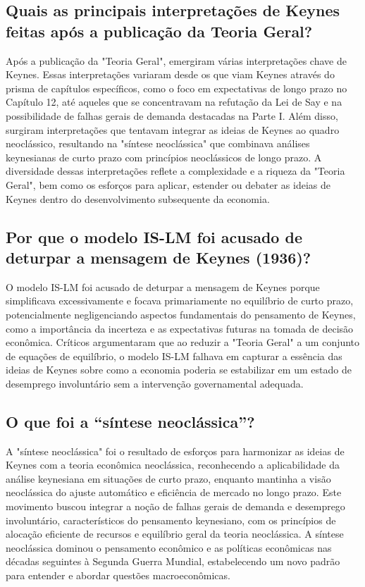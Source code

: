 \documentclass[12pt]{article}
\begin{document}
\subsection{\textbf{Quais as principais interpretações de Keynes feitas após a publicação da Teoria Geral?}}
Após a publicação da "Teoria Geral", emergiram várias interpretações chave de Keynes. Essas interpretações variaram desde os que viam Keynes através do prisma de capítulos específicos, como o foco em expectativas de longo prazo no Capítulo 12, até aqueles que se concentravam na refutação da Lei de Say e na possibilidade de falhas gerais de demanda destacadas na Parte I. Além disso, surgiram interpretações que tentavam integrar as ideias de Keynes ao quadro neoclássico, resultando na "síntese neoclássica" que combinava análises keynesianas de curto prazo com princípios neoclássicos de longo prazo. A diversidade dessas interpretações reflete a complexidade e a riqueza da "Teoria Geral", bem como os esforços para aplicar, estender ou debater as ideias de Keynes dentro do desenvolvimento subsequente da economia.
\subsection{\textbf{Por que o modelo IS-LM foi acusado de deturpar a mensagem de Keynes (1936)?}}
O modelo IS-LM foi acusado de deturpar a mensagem de Keynes porque simplificava excessivamente e focava primariamente no equilíbrio de curto prazo, potencialmente negligenciando aspectos fundamentais do pensamento de Keynes, como a importância da incerteza e as expectativas futuras na tomada de decisão econômica. Críticos argumentaram que ao reduzir a "Teoria Geral" a um conjunto de equações de equilíbrio, o modelo IS-LM falhava em capturar a essência das ideias de Keynes sobre como a economia poderia se estabilizar em um estado de desemprego involuntário sem a intervenção governamental adequada.
\subsection{\textbf{O que foi a “síntese neoclássica”?}}
A "síntese neoclássica" foi o resultado de esforços para harmonizar as ideias de Keynes com a teoria econômica neoclássica, reconhecendo a aplicabilidade da análise keynesiana em situações de curto prazo, enquanto mantinha a visão neoclássica do ajuste automático e eficiência de mercado no longo prazo. Este movimento buscou integrar a noção de falhas gerais de demanda e desemprego involuntário, característicos do pensamento keynesiano, com os princípios de alocação eficiente de recursos e equilíbrio geral da teoria neoclássica. A síntese neoclássica dominou o pensamento econômico e as políticas econômicas nas décadas seguintes à Segunda Guerra Mundial, estabelecendo um novo padrão para entender e abordar questões macroeconômicas.
\end{document}

